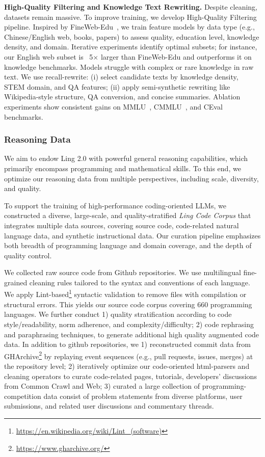 \documentclass[table]{gtech}
\theoremstyle{definition}
\begin{document}
{\bfseries High-Quality Filtering and Knowledge Text Rewriting.} 
Despite cleaning, datasets remain massive. To improve training, we develop  
High-Quality Filtering pipeline. Inspired by FineWeb-Edu~\citep{penedo2024finewebdatasetsdecantingweb}, we train feature models by data type (e.g., Chinese/English web, books, papers) to assess quality, education level, knowledge density, and domain. Iterative experiments identify optimal subsets; for instance, our English web subset is ~5× larger than FineWeb-Edu and outperforms it on knowledge benchmarks. Models struggle with complex or rare knowledge in raw text. We use recall-rewrite: (i) select candidate texts by knowledge density, STEM domain, and QA features; (ii) apply semi-synthetic rewriting like Wikipedia-style structure, QA conversion, and concise summaries. Ablation experiments show consistent gains on MMLU~\citep{mmlu}, CMMLU~\citep{cmmlu}, and CEval~\citep{ceval} benchmarks.

\subsubsection{Reasoning Data}
We aim to endow Ling 2.0 with powerful general reasoning capabilities, which primarily encompass programming and mathematical skills. To this end, we optimize our reasoning data from multiple perspectives, including scale, diversity, and quality.

To support the training of high-performance coding-oriented LLMs, we constructed a diverse, large-scale, and quality-stratified \emph{Ling Code Corpus} that integrates multiple data sources, covering source code, code-related natural language data, and synthetic instructional data. 
Our curation pipeline emphasizes both breadth of programming language and domain coverage, and the depth of quality control.
\label{1b-coder-section}

We collected raw source code from Github repositories. We use
multilingual fine-grained cleaning rules tailored to the syntax and conventions of each language. We apply Lint-based\footnote{\url{https://en.wikipedia.org/wiki/Lint_(software)}} syntactic validation to remove files with compilation or structural errors. This yields our source code corpus covering 660 programming languages. We further conduct 1) quality stratification according to code style/readability, norm adherence, and complexity/difficulty; 2) code rephrasing and paraphrasing techniques, to generate additional high quality augmented code data. In addition to github repositories, we 1) reconstructed commit data from GHArchive\footnote{\url{https://www.gharchive.org/}} by replaying event sequences (e.g., pull requests, issues, merges) at the repository level; 2) iteratively optimize our code-oriented html-parsers and cleaning operators to curate code-related pages, tutorials, developers' discussions from Common Crawl and Web; 3) curated a large collection of programming-competition data consist of problem statements from diverse platforms, user submissions, and related user discussions and commentary threads. 
\end{document}
